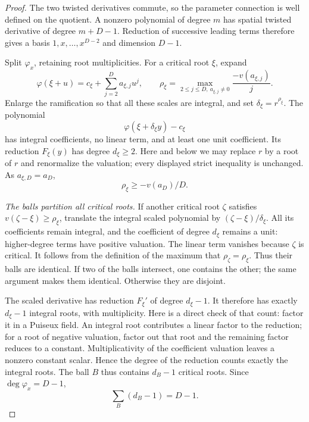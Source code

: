 \begin{proof}
The two twisted derivatives commute, so the parameter connection
is well defined on the quotient. A nonzero polynomial of degree $m$
has spatial twisted derivative of degree $m+D-1$. Reduction of
successive leading terms therefore gives a basis
$1,x,\ldots,x^{D-2}$ and dimension $D-1$.

Split $\varphi_x$, retaining root multiplicities. For a critical root
$\xi$, expand
\[
 \varphi(\xi+u)=c_\xi+\sum_{j=2}^D a_{\xi,j}u^j,
 \qquad
 \rho_\xi=\max_{2\leq j\leq D,\ a_{\xi,j}\ne0}
                    \frac{-v(a_{\xi,j})}{j}.
\]
Enlarge the ramification so that all these scales are integral, and
set $\delta_\xi=r^{\rho_\xi}$. The polynomial
\[
 \varphi(\xi+\delta_\xi y)-c_\xi
\]
has integral coefficients, no linear term, and at least one unit
coefficient. Its reduction $F_\xi(y)$ has degree $d_\xi\geq2$.
Here and below we may replace $r$ by a root of $r$ and renormalize
the valuation; every displayed strict inequality is unchanged.
As $a_{\xi,D}=a_D$,
\begin{equation}\label{eq:balllower}
 \rho_\xi\geq-v(a_D)/D.
\end{equation}

\emph{The balls partition all critical roots.}
If another critical root $\zeta$ satisfies
$v(\zeta-\xi)\geq\rho_\xi$, translate the integral scaled polynomial
by $(\zeta-\xi)/\delta_\xi$. All its coefficients remain integral,
and the coefficient of degree $d_\xi$ remains a unit: higher-degree
terms have positive valuation. The linear term vanishes because
$\zeta$ is critical. It follows from the definition of the maximum
that $\rho_\zeta=\rho_\xi$. Thus their balls are identical.
If two of the balls intersect, one contains the other; the same
argument makes them identical. Otherwise they are disjoint.

The scaled derivative has reduction $F_\xi'$ of degree $d_\xi-1$.
It therefore has exactly $d_\xi-1$ integral roots, with multiplicity.
Here is a direct check of that count: factor it in a Puiseux field.
An integral root contributes a linear factor to the reduction;
for a root of negative valuation, factor out that root and the
remaining factor reduces to a constant. Multiplicativity of the
coefficient valuation leaves a nonzero constant scalar. Hence the
degree of the reduction counts exactly the integral roots.
The ball $B$ thus contains $d_B-1$ critical roots. Since
$\deg\varphi_x=D-1$,
\begin{equation}\label{eq:ballrankcount}
 \sum_B(d_B-1)=D-1.
\end{equation}


\end{proof}
